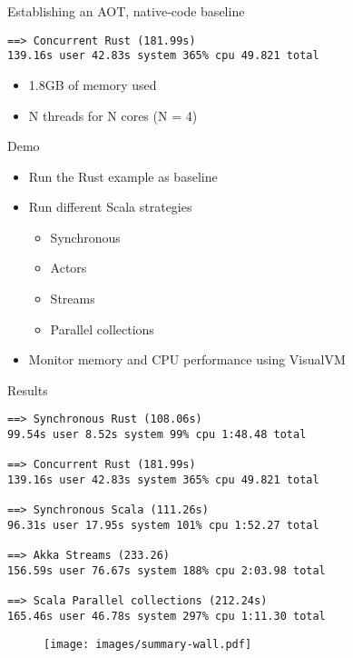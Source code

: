 \documentclass[aspectratio=169,14pt]{beamer}
\newcommand{\megatext}[1]{
  \begin{center}
    \Huge
    #1
  \end{center}
}
\begin{document}
\begin{frame}[fragile]{Establishing an AOT, native-code baseline}
  \begin{verbatim}
==> Concurrent Rust (181.99s)
139.16s user 42.83s system 365% cpu 49.821 total
  \end{verbatim}

  \begin{itemize}
    \item 1.8GB of memory used
    \item N threads for N cores (N = 4)
  \end{itemize}
\end{frame}


\begin{frame}
  \megatext{Demo}

  \begin{itemize}
  \item Run the Rust example as baseline
  \item Run different Scala strategies
    \begin{itemize}
    \item Synchronous
    \item Actors
    \item Streams
    \item Parallel collections
    \end{itemize}
  \item Monitor memory and CPU performance using VisualVM
  \end{itemize}
\end{frame}

\begin{frame}[fragile]{Results}
  \small
  \begin{verbatim}
==> Synchronous Rust (108.06s)
99.54s user 8.52s system 99% cpu 1:48.48 total

==> Concurrent Rust (181.99s)
139.16s user 42.83s system 365% cpu 49.821 total

==> Synchronous Scala (111.26s)
96.31s user 17.95s system 101% cpu 1:52.27 total

==> Akka Streams (233.26)
156.59s user 76.67s system 188% cpu 2:03.98 total

==> Scala Parallel collections (212.24s)
165.46s user 46.78s system 297% cpu 1:11.30 total
  \end{verbatim}
\end{frame}

\begin{frame}
  \begin{figure}
    \texttt{[image: images/summary-wall.pdf]}
  \end{figure}
\end{frame}
\end{document}
